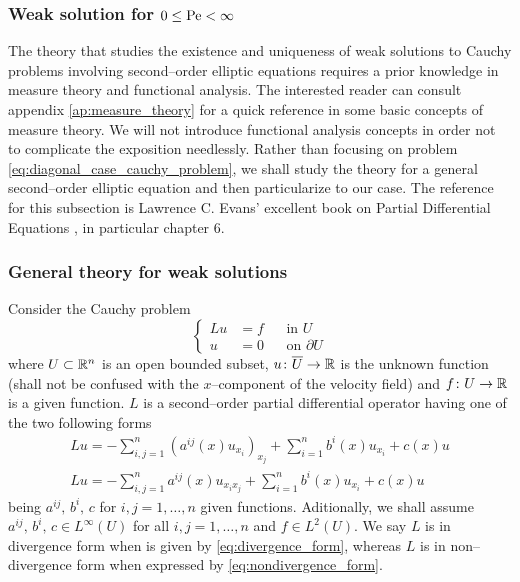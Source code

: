 
\subsubsection{Weak solution for \texorpdfstring{$0 \leq \mathrm{Pe} <
\infty$}{finite Péclet's number}}

The theory that studies the existence and uniqueness of weak solutions to Cauchy
problems involving second--order elliptic equations requires a prior knowledge
in measure theory and functional analysis. The interested reader can consult
appendix \ref{ap:measure_theory} for a quick reference in some basic concepts of
measure theory. We will not introduce functional analysis concepts in order not
to complicate the exposition needlessly. Rather than focusing on problem
\eqref{eq:diagonal_case_cauchy_problem}, we shall study the theory for a general
second--order elliptic equation and then particularize to our case. The
reference for this subsection is Lawrence C. Evans' excellent book on Partial
Differential Equations \cite{evans1998pde}, in particular chapter 6.

\subsubsection*{General theory for weak solutions}

Consider the Cauchy problem
\begin{equation} \label{eq:second_order_elliptic_problem}
	\left\{
		\begin{aligned}
			L u &= f & &\text{in } U \\
			u &= 0 & &\text{on } \partial U
		\end{aligned}
	\right.
\end{equation}
where $U \subset \mathbb{R}^n$ is an open bounded subset, $u \colon \overline{U}
\rightarrow \mathbb{R}$ is the unknown function (shall not be confused with the
$x$--component of the velocity field) and $f \colon U \rightarrow \mathbb{R}$ is a
given function. $L$ is a second--order partial differential operator having one
of the two following forms
\begin{gather}
	L u = - \sum_{i,j=1}^n (a^{ij}(x) u_{x_i})_{x_j} + \sum_{i=1}^n b^i(x) u_{x_i} + c(x) u \label{eq:divergence_form}\\
	L u = - \sum_{i,j=1}^n a^{ij}(x) u_{x_i x_j} + \sum_{i=1}^n b^i(x) u_{x_i} + c(x) u	
	\label{eq:nondivergence_form}
\end{gather}
being $a^{ij}, \, b^i, \, c$ for $i, j = 1, \ldots, n$ given functions.
Aditionally, we shall assume $a^{ij}, \, b^i, \, c \in L^\infty(U)$ for all $i,
j = 1, \ldots, n$ and $f \in L^2(U)$. We say $L$ is in divergence form when is
given by \eqref{eq:divergence_form}, whereas $L$ is in non--divergence form when
expressed by \eqref{eq:nondivergence_form}.

